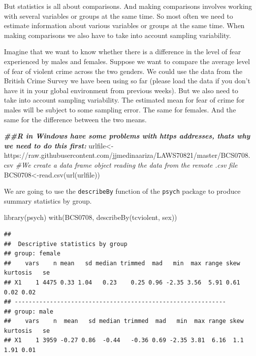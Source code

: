 \documentclass[
]{book}
\newenvironment{Shaded}{\begin{snugshade}}{\end{snugshade}}
\newcommand{\CommentTok}[1]{\textcolor[rgb]{0.56,0.35,0.01}{\textit{#1}}}
\newcommand{\DocumentationTok}[1]{\textcolor[rgb]{0.56,0.35,0.01}{\textbf{\textit{#1}}}}
\newcommand{\FunctionTok}[1]{\textcolor[rgb]{0.00,0.00,0.00}{#1}}
\newcommand{\NormalTok}[1]{#1}
\newcommand{\OtherTok}[1]{\textcolor[rgb]{0.56,0.35,0.01}{#1}}
\newcommand{\StringTok}[1]{\textcolor[rgb]{0.31,0.60,0.02}{#1}}
\begin{document}
But statistics is all about comparisons. And making comparisons involves working with several variables or groups at the same time. So most often we need to estimate information about various variables or groups at the same time. When making comparisons we also have to take into account sampling variability.

Imagine that we want to know whether there is a difference in the level of fear experienced by males and females. Suppose we want to compare the average level of fear of violent crime across the two genders. We could use the data from the British Crime Survey we have been using so far (please load the data if you don't have it in your global environment from previous weeks). But we also need to take into account sampling variability. The estimated mean for fear of crime for males will be subject to some sampling error. The same for females. And the same for the difference between the two means.

\begin{Shaded}
\begin{Highlighting}[]
\DocumentationTok{\#\#R in Windows have some problems with https addresses, that\textquotesingle{}s why we need to do this first:}
\NormalTok{urlfile}\OtherTok{\textless{}{-}}\StringTok{\textquotesingle{}https://raw.githubusercontent.com/jjmedinaariza/LAWS70821/master/BCS0708.csv\textquotesingle{}}
\CommentTok{\#We create a data frame object reading the data from the remote .csv file}
\NormalTok{BCS0708}\OtherTok{\textless{}{-}}\FunctionTok{read.csv}\NormalTok{(}\FunctionTok{url}\NormalTok{(urlfile))}
\end{Highlighting}
\end{Shaded}

We are going to use the \texttt{describeBy} function of the \texttt{psych} package to produce summary statistics by group.

\begin{Shaded}
\begin{Highlighting}[]
\FunctionTok{library}\NormalTok{(psych)}
\FunctionTok{with}\NormalTok{(BCS0708, }\FunctionTok{describeBy}\NormalTok{(tcviolent, sex))}
\end{Highlighting}
\end{Shaded}

\begin{verbatim}
## 
##  Descriptive statistics by group 
## group: female
##    vars    n mean   sd median trimmed  mad   min  max range skew kurtosis   se
## X1    1 4475 0.33 1.04   0.23    0.25 0.96 -2.35 3.56  5.91 0.61     0.02 0.02
## ------------------------------------------------------------ 
## group: male
##    vars    n  mean   sd median trimmed  mad   min  max range skew kurtosis   se
## X1    1 3959 -0.27 0.86  -0.44   -0.36 0.69 -2.35 3.81  6.16  1.1     1.91 0.01
\end{verbatim}
\end{document}
